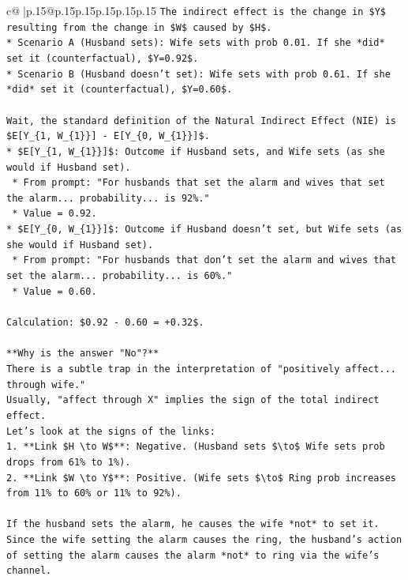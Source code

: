 \documentclass{article}
\begin{document}
{\begin{supertabular}{c@{$\;$}|p{.15\linewidth}@{}p{.15\linewidth}p{.15\linewidth}p{.15\linewidth}p{.15\linewidth}p{.15\linewidth}}
{{{\texttt{The indirect effect is the change in \$Y\$ resulting from the change in \$W\$ caused by \$H\$.} \\
\texttt{*   Scenario A (Husband sets): Wife sets with prob 0.01. If she *did* set it (counterfactual), \$Y=0.92\$.} \\
\texttt{*   Scenario B (Husband doesn't set): Wife sets with prob 0.61. If she *did* set it (counterfactual), \$Y=0.60\$.} \\
\\ 
\texttt{Wait, the standard definition of the Natural Indirect Effect (NIE) is \$E{[}Y\_\{1, W\_\{1\}\}{]} {-} E{[}Y\_\{0, W\_\{1\}\}{]}\$.} \\
\texttt{*   \$E{[}Y\_\{1, W\_\{1\}\}{]}\$: Outcome if Husband sets, and Wife sets (as she would if Husband set).} \\
\texttt{    *   From prompt: "For husbands that set the alarm and wives that set the alarm... probability... is 92\%."} \\
\texttt{    *   Value = 0.92.} \\
\texttt{*   \$E{[}Y\_\{0, W\_\{1\}\}{]}\$: Outcome if Husband doesn't set, but Wife sets (as she would if Husband set).} \\
\texttt{    *   From prompt: "For husbands that don't set the alarm and wives that set the alarm... probability... is 60\%."} \\
\texttt{    *   Value = 0.60.} \\
\\ 
\texttt{Calculation: \$0.92 {-} 0.60 = +0.32\$.} \\
\\ 
\texttt{**Why is the answer "No"?**} \\
\texttt{There is a subtle trap in the interpretation of "positively affect... through wife."} \\
\texttt{Usually, "affect through X" implies the sign of the total indirect effect.} \\
\texttt{Let's look at the signs of the links:} \\
\texttt{1.  **Link \$H \textbackslash{}to W\$**: Negative. (Husband sets \$\textbackslash{}to\$ Wife sets prob drops from 61\% to 1\%).} \\
\texttt{2.  **Link \$W \textbackslash{}to Y\$**: Positive. (Wife sets \$\textbackslash{}to\$ Ring prob increases from 11\% to 60\% or 11\% to 92\%).} \\
\\ 
\texttt{If the husband sets the alarm, he causes the wife *not* to set it. Since the wife setting the alarm causes the ring, the husband's action of setting the alarm causes the alarm *not* to ring via the wife's channel.} \\
}}}
\end{supertabular}}
\end{document}
